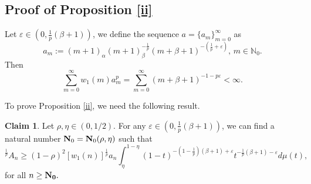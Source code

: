 \documentclass[10pt]{amsart}
\theoremstyle{definition}
\newtheorem{claim}[theorem]{Claim}
\theoremstyle{question}
\numberwithin{equation}{section}
\begin{document}
\subsection{Proof of Proposition \ref{ii}}  
Let $\varepsilon\in (0, \frac{1}{p}(\beta+1))$, we define the sequence $a=\{a_m\}_{m=0}^{\infty}$ as
\begin{equation}\label{am}a_m:=(m+1)_{\alpha}(m+1)_{\beta}^{-\frac{1}{p}}(m+\beta+1)^{-(\frac{1}{p}+\varepsilon)}, \,m\in \mathbb{N}_0.\end{equation}
Then 
$$\sum_{m=0}^{\infty}w_1(m)a_m^p=\sum_{m=0}^{\infty}(m+\beta+1)^{-1-p\varepsilon}<\infty.$$

To prove Proposition \ref{ii}, we need the following result. 
\begin{claim}\label{cla}
Let $\rho, \eta\in (0,1/2)$. For any $\varepsilon\in (0, \frac{1}{p}(\beta+1))$, we can find a natural number ${\bf{N}}_0={\bf{N}}_0(\rho, \eta)$ such that 
\begin{equation}
[w_2(n)]^{\frac{1}{p}}A_n\geq (1-\rho)^2[w_1(n)]^{\frac{1}{p}}a_n\int_{\eta}^{1-\eta}(1-t)^{-(1-\frac{1}{p})(\beta+1)+\varepsilon}t^{-\frac{1}{p}(\beta+1)-\varepsilon}d\mu(t),\nonumber \end{equation} 
for all $n\geq {\bf{N}_0}.$  
\end{claim}
\end{document}
